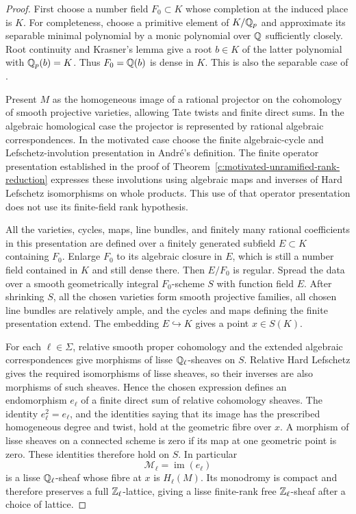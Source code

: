 \begin{proof}
First choose a number field $F_0\subset K$ whose completion at the
induced place is $K$.
For completeness, choose a primitive element of $K/\mathbb Q_p$ and
approximate its separable minimal polynomial by a monic polynomial
over $\mathbb Q$ sufficiently closely. Root continuity and Krasner's lemma
give a root $b\in K$ of the latter polynomial with
$\mathbb Q_p(b)=K$. Thus $F_0=\mathbb Q(b)$ is dense in $K$.
This is also the separable case of
\citet[Theorem~2.1 and its proof, pp.~2--3]
{c_conrad_localglobal}.

Present $M$ as the homogeneous image of a rational projector on the
cohomology of smooth projective varieties, allowing Tate twists and
finite direct sums. In the algebraic homological case the projector
is represented by rational algebraic correspondences.
In the motivated case choose the finite algebraic-cycle and
Lefschetz-involution presentation in Andr\'e's definition.
The finite operator presentation established in the proof of
Theorem~\ref{c:motivated-unramified-rank-reduction} expresses these
involutions using algebraic maps and inverses of Hard Lefschetz
isomorphisms on whole products.
This use of that operator presentation does not use its
finite-field rank hypothesis.

All the varieties, cycles, maps, line bundles, and finitely many
rational coefficients in this presentation are defined over a
finitely generated subfield $E\subset K$ containing $F_0$.
Enlarge $F_0$ to its algebraic closure in $E$, which is still a
number field contained in $K$ and still dense there.
Then $E/F_0$ is regular. Spread the data over a smooth geometrically
integral $F_0$-scheme $S$ with function field $E$.
After shrinking $S$, all the chosen varieties form smooth projective
families, all chosen line bundles are relatively ample, and the
cycles and maps defining the finite presentation extend.
The embedding $E\hookrightarrow K$ gives a point $x\in S(K)$.

For each $\ell\in\Sigma$, relative smooth proper cohomology and
the extended algebraic correspondences give morphisms of lisse
$\mathbb Q_\ell$-sheaves on $S$. Relative Hard Lefschetz gives the
required isomorphisms of lisse sheaves, so their inverses are also
morphisms of such sheaves. Hence the chosen expression defines
an endomorphism $e_\ell$ of a finite direct sum of relative
cohomology sheaves.
The identity $e_\ell^2=e_\ell$, and the identities saying that
its image has the prescribed homogeneous degree and twist, hold
at the geometric fibre over $x$.
A morphism of lisse sheaves on a connected scheme is zero if its
map at one geometric point is zero. These identities therefore
hold on $S$. In particular
\[
 \mathcal M_\ell=\operatorname{im}(e_\ell)
\]
is a lisse $\mathbb Q_\ell$-sheaf whose fibre at $x$ is $H_\ell(M)$.
Its monodromy is compact and therefore preserves a full
$\mathbb Z_\ell$-lattice, giving a lisse finite-rank free
$\mathbb Z_\ell$-sheaf after a choice of lattice.


\end{proof}
